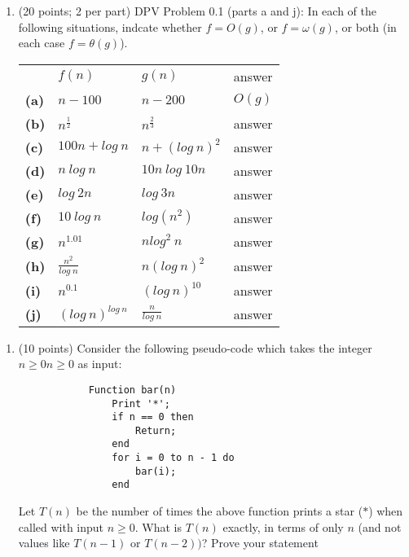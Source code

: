 \documentclass{article}
\begin{document}
    \begin{enumerate}[label=\textbf{Q1}]
        \item (20 points; 2 per part) DPV Problem 0.1 (parts a and j): In each of the following situations, indcate whether $f = O(g)$, or $f = \omega(g)$, or both (in each case $f = \theta(g)$).\\[0.25in]
        \begin{tabular}{l l l l}
            &$f(n)$ & $g(n)$ & answer\\
            \textbf{(a)} & $n - 100$ & $n - 200$ & $O(g)$\\
            \textbf{(b)} & $n^{\frac{1}{2}}$ & $n^{\frac{2}{3}}$ & answer\\
            \textbf{(c)} & $100n + log\ n$ & $n + (log\ n)^2$ & answer\\
            \textbf{(d)} & $n\ log\ n$ & $10n\ log\ 10n$ & answer\\
            \textbf{(e)} & $log\ 2n$ & $log\ 3n$ & answer\\
            \textbf{(f)} & $10\ log\ n$ & $log(n^2)$ & answer\\
            \textbf{(g)} & $n^{1.01}$ & $nlog^2\ n$ & answer\\
            \textbf{(h)} & $\frac{n^2}{log\ n}$ & $n(log\ n)^2$ & answer\\
            \textbf{(i)} & $n^{0.1}$ & $(log\ n)^{10}$ & answer\\
            \textbf{(j)} & $(log\ n)^{log\ n}$ & $\frac{n}{log\ n}$ & answer\\
        \end{tabular}
    \end{enumerate}

    \begin{enumerate}[label=\textbf{Q2}]
        \item (10 points) Consider the following pseudo-code which takes the integer $n \geq 0n \geq 0$ as input:
        \begin{verbatim}
            Function bar(n)
                Print '*';
                if n == 0 then
                    Return;
                end
                for i = 0 to n - 1 do
                    bar(i);
                end
        \end{verbatim}
        Let $T(n)$ be the number of times the above function prints a star ($*$) when called with input $n \geq 0$.
        What is $T(n)$ exactly, in terms of only $n$ (and not values like $T(n - 1)$ or $T(n - 2))$? Prove your
        statement
    \end{enumerate}
\end{document}
